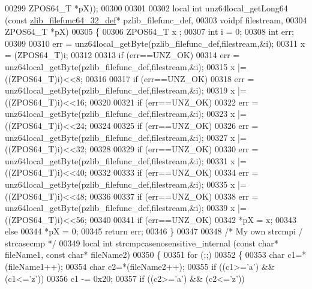 \begin{DoxyCode}
00299     ZPOS64\_T *pX));
00300 
00301 
00302 local \textcolor{keywordtype}{int} unz64local\_getLong64 (\textcolor{keyword}{const} \hyperlink{structzlib__filefunc64__32__def__s}{zlib\_filefunc64\_32\_def}* pzlib\_filefunc\_def,
00303                             voidpf filestream,
00304                             ZPOS64\_T *pX)
00305 \{
00306     ZPOS64\_T x ;
00307     \textcolor{keywordtype}{int} i = 0;
00308     \textcolor{keywordtype}{int} err;
00309 
00310     err = unz64local\_getByte(pzlib\_filefunc\_def,filestream,&i);
00311     x = (ZPOS64\_T)i;
00312 
00313     \textcolor{keywordflow}{if} (err==UNZ\_OK)
00314         err = unz64local\_getByte(pzlib\_filefunc\_def,filestream,&i);
00315     x |= ((ZPOS64\_T)i)<<8;
00316 
00317     \textcolor{keywordflow}{if} (err==UNZ\_OK)
00318         err = unz64local\_getByte(pzlib\_filefunc\_def,filestream,&i);
00319     x |= ((ZPOS64\_T)i)<<16;
00320 
00321     \textcolor{keywordflow}{if} (err==UNZ\_OK)
00322         err = unz64local\_getByte(pzlib\_filefunc\_def,filestream,&i);
00323     x |= ((ZPOS64\_T)i)<<24;
00324 
00325     \textcolor{keywordflow}{if} (err==UNZ\_OK)
00326         err = unz64local\_getByte(pzlib\_filefunc\_def,filestream,&i);
00327     x |= ((ZPOS64\_T)i)<<32;
00328 
00329     \textcolor{keywordflow}{if} (err==UNZ\_OK)
00330         err = unz64local\_getByte(pzlib\_filefunc\_def,filestream,&i);
00331     x |= ((ZPOS64\_T)i)<<40;
00332 
00333     \textcolor{keywordflow}{if} (err==UNZ\_OK)
00334         err = unz64local\_getByte(pzlib\_filefunc\_def,filestream,&i);
00335     x |= ((ZPOS64\_T)i)<<48;
00336 
00337     \textcolor{keywordflow}{if} (err==UNZ\_OK)
00338         err = unz64local\_getByte(pzlib\_filefunc\_def,filestream,&i);
00339     x |= ((ZPOS64\_T)i)<<56;
00340 
00341     \textcolor{keywordflow}{if} (err==UNZ\_OK)
00342         *pX = x;
00343     \textcolor{keywordflow}{else}
00344         *pX = 0;
00345     \textcolor{keywordflow}{return} err;
00346 \}
00347 
00348 \textcolor{comment}{/* My own strcmpi / strcasecmp */}
00349 local \textcolor{keywordtype}{int} strcmpcasenosensitive\_internal (\textcolor{keyword}{const} \textcolor{keywordtype}{char}* fileName1, \textcolor{keyword}{const} \textcolor{keywordtype}{char}* fileName2)
00350 \{
00351     \textcolor{keywordflow}{for} (;;)
00352     \{
00353         \textcolor{keywordtype}{char} c1=*(fileName1++);
00354         \textcolor{keywordtype}{char} c2=*(fileName2++);
00355         \textcolor{keywordflow}{if} ((c1>=\textcolor{charliteral}{'a'}) && (c1<=\textcolor{charliteral}{'z'}))
00356             c1 -= 0x20;
00357         \textcolor{keywordflow}{if} ((c2>=\textcolor{charliteral}{'a'}) && (c2<=\textcolor{charliteral}{'z'}))

\end{DoxyCode}
